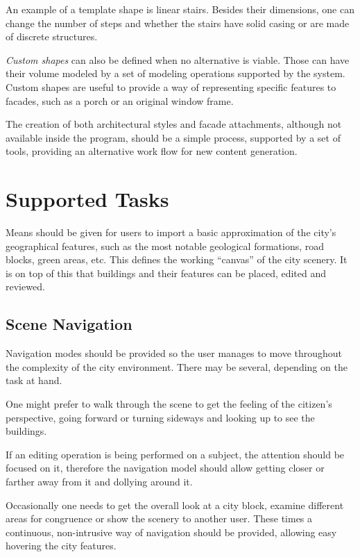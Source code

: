An example of a template shape is linear stairs.
Besides their dimensions, one can change the number of steps and
whether the stairs have solid casing or are made of discrete structures.


\emph{Custom shapes} can also be defined when no alternative is viable.
Those can have their volume modeled by a set of modeling operations
supported by the system.
Custom shapes are useful to provide a way of representing
specific features to facades, such as a porch or an original window frame.

The creation of both architectural styles and facade attachments,
although not available inside the program, should be a simple process,
supported by a set of tools, providing an alternative work flow for new
content generation.



\section{Supported Tasks}

Means should be given for users to import a basic approximation of the
city's geographical features, such as the most notable geological formations,
road blocks, green areas, etc.
This defines the working ``canvas'' of the city scenery.
It is on top of this that buildings and their features can be placed, edited and reviewed.


\subsection{Scene Navigation}

Navigation modes should be provided so the user manages
to move throughout the complexity of the city environment.
There may be several, depending on the task at hand.

One might prefer to walk through the scene to get the feeling of the citizen's perspective,
going forward or turning sideways and looking up to see the buildings.

If an editing operation is being performed on a subject, the attention should be focused on it,
therefore the navigation model should allow getting closer or farther away from it and dollying around it.

Occasionally one needs to get the overall look at a city block, examine different areas for congruence
or show the scenery to another user. These times a continuous, non-intrusive way of navigation should be provided,
allowing easy hovering the city features.


